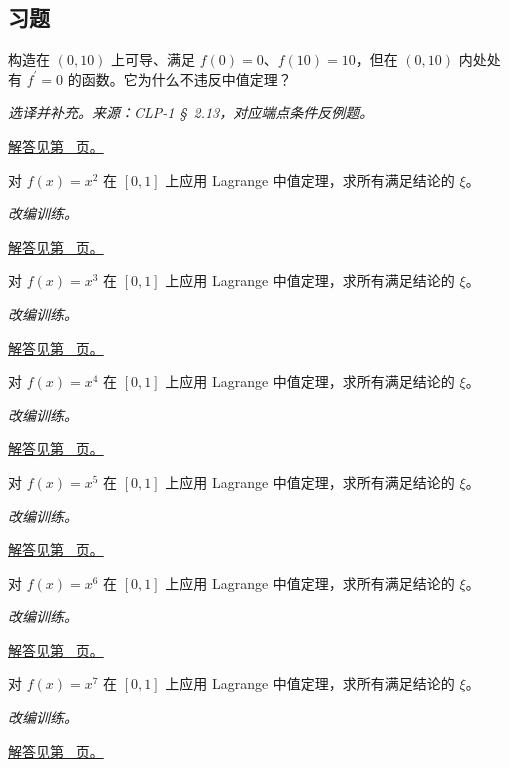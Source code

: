 \documentclass[12pt,fontset=fandol]{ctexart}
\begin{document}
\subsection{习题}
\begin{example}[端点连续性不能省略]\label{ex:c10q1}
构造在 $(0,10)$ 上可导、满足 $f(0)=0$、$f(10)=10$，但在 $(0,10)$ 内处处有 $f^{\prime}=0$ 的函数。它为什么不违反中值定理？
\par\textit{选译并补充。来源：CLP-1 \S~2.13，对应端点条件反例题。}\par\hyperref[ans:c10q1]{解答见第~\pageref{ans:c10q1} 页。}
\end{example}
\begin{example}[中值点的精确计算]\label{ex:c10q2}
对 $f(x)=x^{2}$ 在 $[0,1]$ 上应用 Lagrange 中值定理，求所有满足结论的 $\xi$。
\par\textit{改编训练。}\par\hyperref[ans:c10q2]{解答见第~\pageref{ans:c10q2} 页。}
\end{example}
\begin{example}[中值点的精确计算]\label{ex:c10q3}
对 $f(x)=x^{3}$ 在 $[0,1]$ 上应用 Lagrange 中值定理，求所有满足结论的 $\xi$。
\par\textit{改编训练。}\par\hyperref[ans:c10q3]{解答见第~\pageref{ans:c10q3} 页。}
\end{example}
\begin{example}[中值点的精确计算]\label{ex:c10q4}
对 $f(x)=x^{4}$ 在 $[0,1]$ 上应用 Lagrange 中值定理，求所有满足结论的 $\xi$。
\par\textit{改编训练。}\par\hyperref[ans:c10q4]{解答见第~\pageref{ans:c10q4} 页。}
\end{example}
\begin{example}[中值点的精确计算]\label{ex:c10q5}
对 $f(x)=x^{5}$ 在 $[0,1]$ 上应用 Lagrange 中值定理，求所有满足结论的 $\xi$。
\par\textit{改编训练。}\par\hyperref[ans:c10q5]{解答见第~\pageref{ans:c10q5} 页。}
\end{example}
\begin{example}[中值点的精确计算]\label{ex:c10q6}
对 $f(x)=x^{6}$ 在 $[0,1]$ 上应用 Lagrange 中值定理，求所有满足结论的 $\xi$。
\par\textit{改编训练。}\par\hyperref[ans:c10q6]{解答见第~\pageref{ans:c10q6} 页。}
\end{example}
\begin{example}[中值点的精确计算]\label{ex:c10q7}
对 $f(x)=x^{7}$ 在 $[0,1]$ 上应用 Lagrange 中值定理，求所有满足结论的 $\xi$。
\par\textit{改编训练。}\par\hyperref[ans:c10q7]{解答见第~\pageref{ans:c10q7} 页。}
\end{example}
\end{document}
